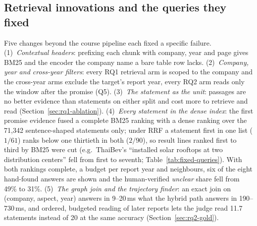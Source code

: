 \documentclass[11pt]{article}
\begin{document}
\subsection{Retrieval innovations and the queries they fixed}
\label{sec:innovations}
Five changes beyond the course pipeline each fixed a specific failure. (1)~\emph{Contextual headers}: prefixing each chunk with company, year and page gives BM25 and the encoder the company name a bare table row lacks. (2)~\emph{Company, year and cross-year filters}: every RQ1 retrieval arm is scoped to the company and the cross-year arms exclude the target's report year, every RQ2 arm reads only the window after the promise (Q5). (3)~\emph{The statement as the unit}: passages are no better evidence than statements on either split and cost more to retrieve and read (Section~\ref{sec:rq1-ablation}). (4)~\emph{Every statement in the dense index}: the first promise evidence fused a complete BM25 ranking with a dense ranking over the 71,342 sentence-shaped statements only; under RRF a statement first in one list ($1/61$) ranks below one thirtieth in both ($2/90$), so result lines ranked first to third by BM25 were cut (e.g.\ ThaiBev's ``installed solar rooftops at two distribution centers'' fell from first to seventh; Table~\ref{tab:fixed-queries}). With both rankings complete, a budget per report year and neighbours, six of the eight hand-found answers are shown and the human-verified \emph{unclear} share fell from 49\% to 31\%. (5)~\emph{The graph join and the trajectory finder}: an exact join on (company, aspect, year) answers in 9--20\,ms what the hybrid path answers in 190--730\,ms, and ordered, budgeted reading of later reports lets the judge read 11.7 statements instead of 20 at the same accuracy (Section~\ref{sec:rq2-gold}).
\end{document}

